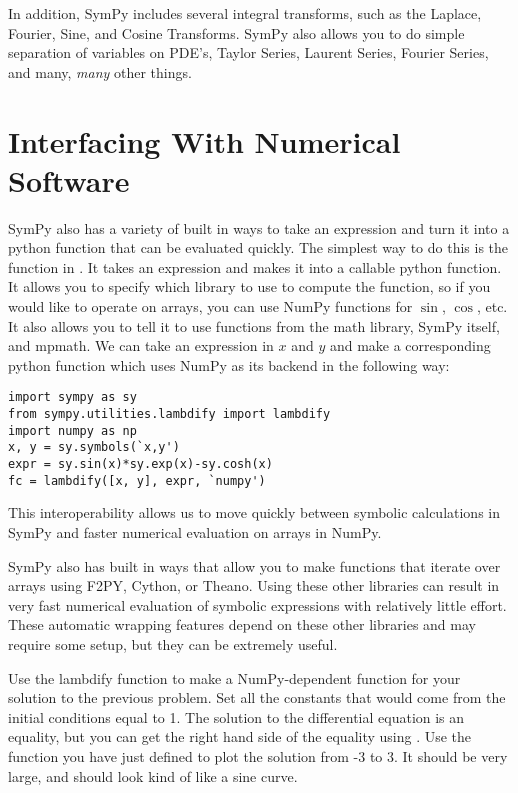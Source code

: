 In addition, SymPy includes several integral transforms, such as the Laplace, Fourier, Sine, and Cosine Transforms.
SymPy also allows you to do simple separation of variables on PDE's, Taylor Series, Laurent Series, Fourier Series, and many, \textit{many} other things.

\section*{Interfacing With Numerical Software}
SymPy also has a variety of built in ways to take an expression and turn it into a python function that can be evaluated quickly.
The simplest way to do this is the  function in .
It takes an expression and makes it into a callable python function. 
It allows you to specify which library to use to compute the function, so if you would like to operate on arrays, you can use NumPy functions for $\sin$, $\cos$, etc.
It also allows you to tell it to use functions from the math library, SymPy itself, and mpmath.
We can take an expression in $x$ and $y$ and make a corresponding python function  which uses NumPy as its backend in the following way:
\begin{lstlisting}
import sympy as sy
from sympy.utilities.lambdify import lambdify
import numpy as np
x, y = sy.symbols(`x,y')
expr = sy.sin(x)*sy.exp(x)-sy.cosh(x)
fc = lambdify([x, y], expr, `numpy')
\end{lstlisting}
This interoperability allows us to move quickly between symbolic calculations in SymPy and faster numerical evaluation on arrays in NumPy.

SymPy also has built in ways that allow you to make functions that iterate over arrays using F2PY, Cython, or Theano.
Using these other libraries can result in very fast numerical evaluation of symbolic expressions with relatively little effort.
These automatic wrapping features depend on these other libraries and may require some setup, but they can be extremely useful.

\begin{problem}
Use the lambdify function to make a NumPy-dependent function for your solution to the previous problem. Set all the constants that would come from the initial conditions equal to 1.
The solution to the differential equation is an equality, but you can get the right hand side of the equality using .
Use the function you have just defined to plot the solution from -3 to 3. 
It should be very large, and should look kind of like a sine curve.
\end{problem}

